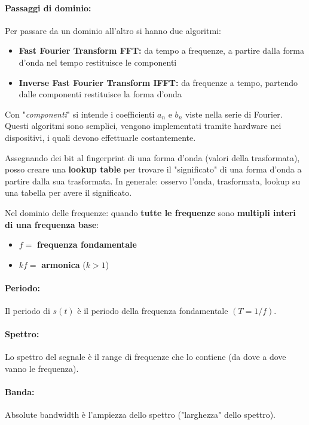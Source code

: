 \paragraph{Passaggi di dominio:} Per passare da un dominio all'altro si hanno due algoritmi:
\begin{itemize}
	\item \textbf{Fast Fourier Transform FFT:} da tempo a frequenze, a partire dalla forma d'onda nel tempo restituisce le componenti
	
    \item \textbf{Inverse Fast Fourier Transform IFFT:} da frequenze a tempo, partendo dalle componenti restituisce la forma d'onda
\end{itemize}

Con "\textit{componenti}" si intende i coefficienti $a_n$ e $b_n$ viste nella serie di Fourier. Questi algoritmi sono semplici, vengono implementati tramite hardware nei dispositivi, i quali devono effettuarle costantemente.

Assegnando dei bit al fingerprint di una forma d'onda (valori della trasformata), posso creare una \textbf{lookup table} per trovare il "significato" di una forma d'onda a partire dalla sua trasformata. In generale: osservo l'onda, trasformata, lookup su una tabella per avere il significato.

Nel dominio delle frequenze: quando \textbf{tutte le frequenze} sono \textbf{multipli interi di una frequenza base}:
\begin{itemize}
	\item $f=$ \textbf{frequenza fondamentale}
    
	\item $kf =$ \textbf{armonica} ($k>1$)
\end{itemize} 

\paragraph{Periodo:} Il periodo di $s(t)$ è il periodo della frequenza fondamentale $(T = 1/f)$.

\paragraph{Spettro:} Lo spettro del segnale è il range di frequenze che lo contiene (da dove a dove vanno le frequenza).

\paragraph{Banda:} Absolute bandwidth è l'ampiezza dello spettro ("larghezza" dello spettro).

